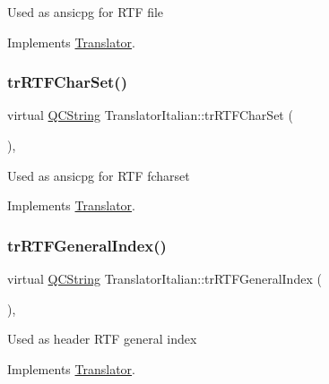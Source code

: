 Used as ansicpg for R\+TF file 

Implements \mbox{\hyperlink{class_translator_a9953a4c0e6a4fc7d017abcd5c2939e0f}{Translator}}.

\mbox{\label{class_translator_italian_a84e928830059a03c4be6680998820f25}} 
\subsubsection{\texorpdfstring{trRTFCharSet()}{trRTFCharSet()}}
{\footnotesize\ttfamily virtual \mbox{\hyperlink{class_q_c_string}{Q\+C\+String}} Translator\+Italian\+::tr\+R\+T\+F\+Char\+Set (\begin{DoxyParamCaption}{ }\end{DoxyParamCaption})\hspace{0.3cm}{\ttfamily [inline]}, {\ttfamily [virtual]}}

Used as ansicpg for R\+TF fcharset 

Implements \mbox{\hyperlink{class_translator_afad391f3cbfb5ce6332b7239f8e2049a}{Translator}}.

\mbox{\label{class_translator_italian_a119438dfb5ccefab32e500b8b8d8ee7a}} 
\subsubsection{\texorpdfstring{trRTFGeneralIndex()}{trRTFGeneralIndex()}}
{\footnotesize\ttfamily virtual \mbox{\hyperlink{class_q_c_string}{Q\+C\+String}} Translator\+Italian\+::tr\+R\+T\+F\+General\+Index (\begin{DoxyParamCaption}{ }\end{DoxyParamCaption})\hspace{0.3cm}{\ttfamily [inline]}, {\ttfamily [virtual]}}

Used as header R\+TF general index 

Implements \mbox{\hyperlink{class_translator}{Translator}}.

\mbox{\label{class_translator_italian_a15b0cd21a8b1ed806689f0f37a77ad98}} 
